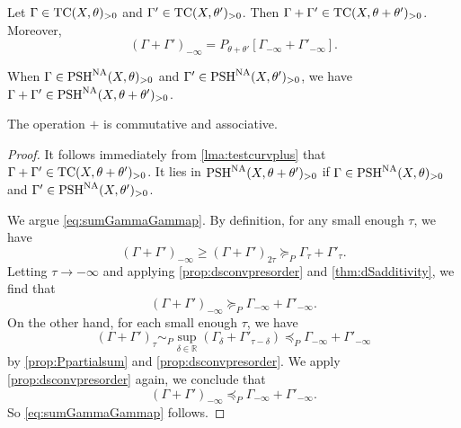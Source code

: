 \begin{proposition}\label{prop:testcurvesumproperty}
    Let $\Gamma \in \mathrm{TC}(X,\theta)_{>0}$ and $\Gamma' \in \mathrm{TC}(X,\theta')_{>0}$. Then $\Gamma+\Gamma'\in \mathrm{TC}(X,\theta+\theta')_{>0}$. Moreover,
    \begin{equation}\label{eq:sumGammaGammap}
    (\Gamma+\Gamma')_{-\infty}=P_{\theta+\theta'}\left[\Gamma_{-\infty}+\Gamma'_{-\infty}\right].
    \end{equation}

    When $\Gamma\in \mathrm{PSH}^{\mathrm{NA}}(X,\theta)_{>0}$ and $\Gamma'\in \mathrm{PSH}^{\mathrm{NA}}(X,\theta')_{>0}$, we have $\Gamma+\Gamma'\in \mathrm{PSH}^{\mathrm{NA}}(X,\theta+\theta')_{>0}$.

    The operation $+$ is commutative and associative.
\end{proposition}
\begin{proof}
    It follows immediately from \cref{lma:testcurvplus} that $\Gamma+\Gamma'\in \mathrm{TC}(X,\theta+\theta')_{>0}$. It lies in $\mathrm{PSH}^{\mathrm{NA}}(X,\theta+\theta')_{>0}$ if $\Gamma\in \mathrm{PSH}^{\mathrm{NA}}(X,\theta)_{>0}$ and $\Gamma'\in \mathrm{PSH}^{\mathrm{NA}}(X,\theta')_{>0}$.

    We argue \eqref{eq:sumGammaGammap}. By definition, for any small enough $\tau$, we have
    \[
    (\Gamma+\Gamma')_{-\infty}\geq (\Gamma+\Gamma')_{2\tau}\succeq_P \Gamma_{\tau}+\Gamma'_{\tau}.
    \]
    Letting $\tau\to -\infty$ and applying \cref{prop:dsconvpresorder} and \cref{thm:dSadditivity}, we find that
    \[
    (\Gamma+\Gamma')_{-\infty}\succeq_P \Gamma_{-\infty}+\Gamma'_{-\infty}.
    \]
    On the other hand, for each small enough $\tau$, we have
    \[
    (\Gamma+\Gamma')_{\tau}\sim_P \sup_{\delta\in \mathbb{R}}\left( \Gamma_\delta+\Gamma'_{\tau-\delta}\right) \preceq_P \Gamma_{-\infty}+\Gamma'_{-\infty}
    \]
    by \cref{prop:Ppartialsum} and \cref{prop:dsconvpresorder}. We apply \cref{prop:dsconvpresorder} again, we conclude that
    \[
     (\Gamma+\Gamma')_{-\infty} \preceq_P \Gamma_{-\infty}+\Gamma'_{-\infty}.
    \]
    So \eqref{eq:sumGammaGammap} follows.




\end{proof}
